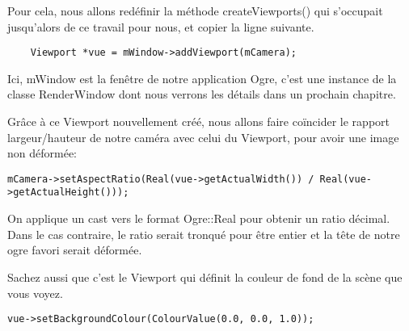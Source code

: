 \documentclass[10pt,a4paper]{report}
\begin{document}
\begin{comment}
LA VERSION AVANT D'AJOUTER LA LISTE ITEMIZE
La fa\c{c}on dont la cam\'era rend \`{a} l'\'ecran ce qu'elle voit ne d\'epend pas que d'elle. En effet, la taille de votre zone de rendu et son format seront r\'epercut\'es sur la portion de sc\`ene qu'il vous sera donn\'e de voir. Si l'on ne tenait pas compte de ces param\`etres, on pourrait obtenir une image aplatie si l'on \'elargit la zone de rendu, ou bien au contraire compress\'ee si l'on diminue la largeur en laissant la hauteur constante.

La fen\^etre de votre application est un objet distinct de la zone de rendu. En effet, dans une m\^eme fen\^etre, vous pouvez afficher le rendu de plusieurs cam\'era dans la sc\`ene, voire des cam\'eras de diff\'erents sceneManager.

La gestion de l'affichage dans une zone de rendu est laiss\'ee \`{a} la classe Viewport, qui est simplement la partie de votre fen\^etre o\`{u} s'affiche ce que voit votre cam\'era. De ces deux liens d\'ecoule la cr\'eation du Viewport, appel\'ee par la fen\^etre et prenant en param\`etre la cam\'era concern\'ee.
\end{comment}

Pour cela, nous allons red\'efinir la m\'ethode createViewports() qui s'occupait jusqu'alors de ce travail pour nous, et copier la ligne suivante.

\begin{lstlisting}
	Viewport *vue = mWindow->addViewport(mCamera);
\end{lstlisting}

Ici, mWindow est la fen\^etre de notre application Ogre, c'est une instance de la classe RenderWindow dont nous verrons les d\'etails dans un prochain chapitre.

Gr\^{a}ce \`{a} ce Viewport nouvellement cr\'e\'e, nous allons faire co\"incider le rapport largeur/hauteur de notre cam\'era avec celui du Viewport, pour avoir une image non d\'eform\'ee:
\begin{lstlisting}
mCamera->setAspectRatio(Real(vue->getActualWidth()) / Real(vue->getActualHeight()));
\end{lstlisting}

On applique un cast vers le format Ogre::Real pour obtenir un ratio d\'ecimal. Dans le cas contraire, le ratio serait tronqu\'e pour \^etre entier et la t\^ete de notre ogre favori serait d\'eform\'ee.

Sachez aussi que c'est le Viewport qui d\'efinit la couleur de fond de la sc\`ene que vous voyez. 
\begin{lstlisting}
vue->setBackgroundColour(ColourValue(0.0, 0.0, 1.0));
\end{lstlisting}
\end{document}
